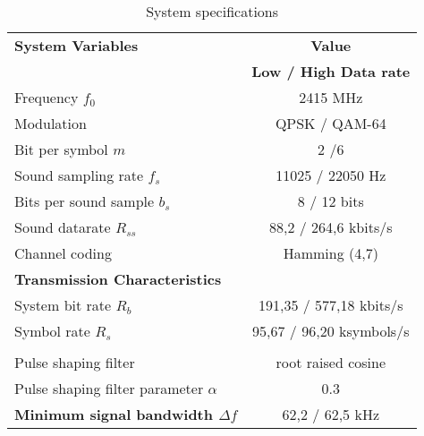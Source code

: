 \begin{table}[htbp]
  \centering
  \caption{System specifications}
    \begin{tabular}{lc}
    \rowcolor[rgb]{ 0,  0,  0} \textcolor[rgb]{ 1,  1,  1}{\textbf{System Variables}} & \textcolor[rgb]{ 1,  1,  1}{\textbf{Value}} \\
    \rowcolor[rgb]{ 0,  0,  0} \textcolor[rgb]{ 1,  1,  1}{} & \textcolor[rgb]{ 1,  1,  1}{\textbf{Low / High Data rate}} \\
    Frequency $f_0$ & 2415 MHz \\
    Modulation & QPSK / QAM-64 \\
    Bit per symbol $m$ & 2 /6 \\
    Sound sampling rate $f_s$  & 11025 / 22050 Hz \\
    Bits per sound sample $b_s$ & 8 / 12 bits \\
    Sound datarate $R_{ss}$ & 88,2 / 264,6 kbits/s \\
    Channel coding & Hamming (4,7) \\
    \rowcolor[rgb]{ 0,  0,  0} \textcolor[rgb]{ 1,  1,  1}{\textbf{Transmission Characteristics}} & \textcolor[rgb]{ 1,  1,  1}{} \\
    System bit rate $R_b$ & 191,35 / 577,18 kbits/s \\
    Symbol rate $R_s$ & 95,67 / 96,20 ksymbols/s \\
          &  \\
    Pulse shaping filter & root raised cosine \\
    Pulse shaping filter parameter $\alpha$ & 0.3 \\
    \boldmath{}\textbf{Minimum signal bandwidth $\Delta f$}\unboldmath{} & 62,2 / 62,5 kHz \\
    \end{tabular}%
  \label{tab:specs_short}%
\end{table}%
